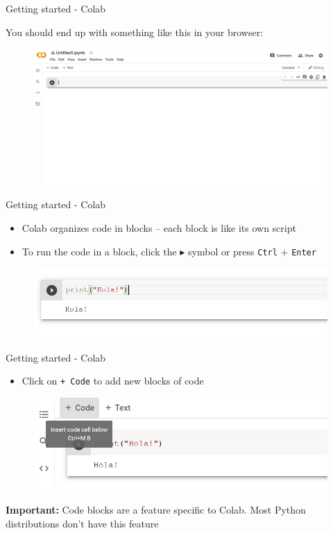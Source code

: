 \documentclass[aspectratio=169]{beamer}
\begin{document}
\begin{frame}{Getting started - Colab}

	You should end up with something like this in your browser:

	\begin{figure}
		\centering
		\includegraphics[width=0.9\linewidth]{img/colab.png}
	\end{figure}

\end{frame}

\begin{frame}{Getting started - Colab}

	\begin{itemize}
		\item Colab organizes code in blocks -- each block is like its own script
		\item To run the code in a block, 
		click the $\blacktriangleright$ symbol or press \texttt{Ctrl} + \texttt{Enter}
	\end{itemize}

	\begin{figure}
		\centering
		\includegraphics[width=0.6\linewidth]{img/block_of_code.png}
	\end{figure}

\end{frame}

\begin{frame}{Getting started - Colab}

	\begin{itemize}
		\item Click on \texttt{+ Code} to add new blocks of code
	\end{itemize}

	\begin{figure}
		\centering
		\includegraphics[width=0.6\linewidth]{img/add_code.png}
	\end{figure}	

	\textbf{Important:} Code blocks are a feature specific to Colab. Most Python distributions don't have this feature

\end{frame}
\end{document}
